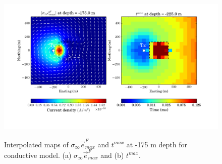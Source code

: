\documentclass[a4paper, 11pt]{article}
\newcommand{\siginf}{\sigma_\infty}
\newcommand {\e}  { {\vec e} }
\begin{document}
\begin{figure}[htb]
  \centering
  \includegraphics[height=0.4\textheight]{figures/synthetic/JmaxTmaxCase2_plan.png} \\
  \caption{Interpolated maps of $\siginf\e^F_{max}$ and $t^{max}$ at -175 m depth for conductive model. (a) $\siginf\e^F_{max}$ and (b) $t^{max}$.}
  \label{F: JmaxTmaxCase2_plan}
\end{figure}
\end{document}
